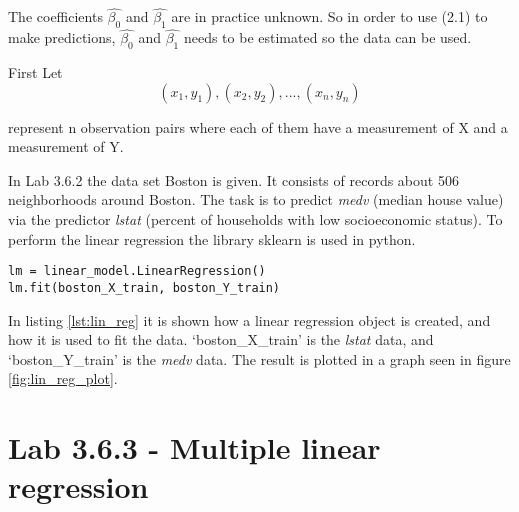 The coefficients 
$\hat{\beta_0}$ and  $\hat{\beta_1}$ are in practice unknown. So in order to use (2.1) to make predictions, $\hat{\beta_0}$ and  $\hat{\beta_1}$ needs to be estimated so the data can be used. 

First Let 
\begin{equation}
(x_1, y_1), (x_2, y_2),..., (x_n, y_n)
\end{equation}

represent n observation pairs where each of them have a measurement of X and a measurement of Y.



In Lab 3.6.2 the data set Boston is given. It consists of records about 506 neighborhoods around Boston. The task is to predict \emph{medv} (median house  value) via the predictor \emph{lstat} (percent of households with low socioeconomic status).
To perform the linear regression the library sklearn is used in python. 

\lstset{}
\begin{lstlisting}[caption={Python Linear Regression function}, label=lst:lin_reg, mathescape=true]
lm = linear_model.LinearRegression()
lm.fit(boston_X_train, boston_Y_train)
\end{lstlisting}

In listing \ref{lst:lin_reg} it is shown how a linear regression object is created, and how it is used to fit the data. ‘boston\_X\_train’ is the \emph{lstat} data, and ‘boston\_Y\_train’ is the \emph{medv} data.
The result is plotted in a graph seen in figure \ref{fig:lin_reg_plot}.

 

\section{Lab 3.6.3 - Multiple linear regression}


